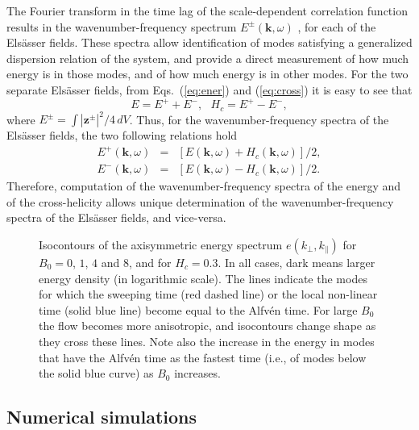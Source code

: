 \documentclass[aip,pop,reprint,amsmath,amssymb,floatfix]{revtex4-1}
\renewcommand{\vec}[1]{\mathbf{#1}}
\begin{document}
The Fourier transform in the time lag of the scale-dependent correlation function results in the wavenumber-frequency spectrum $E^\pm(\vec{k},\omega)$ \cite{clark_di_leoni_quantification_2014, clark_di_leoni_spatio-temporal_2015}, for each of the Els\"asser fields. These spectra allow identification of modes satisfying a generalized dispersion relation of the system, and provide a direct measurement of how much energy is in those modes, and of how much energy is in other modes. For the two separate Els\"asser fields, from Eqs.~(\ref{eq:ener}) and (\ref{eq:cross}) it is easy to see that
\begin{equation}
E = E^+ + E^- , \,\,\,\, H_c = E^+ - E^- ,
\end{equation}
where $E^\pm = \int |\vec{z}^\pm|^2/4 \, dV$. Thus, for the wavenumber-frequency spectra of the Els\"asser fields, the two following relations hold
\begin{eqnarray}
E^+(\vec{k},\omega) &=& [E(\vec{k},\omega) + H_c(\vec{k},\omega)]/2, \\
E^-(\vec{k},\omega) &=& [E(\vec{k},\omega) - H_c(\vec{k},\omega)]/2.
\end{eqnarray}
Therefore, computation of the wavenumber-frequency spectra of the energy and of the cross-helicity allows unique determination of the wavenumber-frequency spectra of the Els\"asser fields, and vice-versa.

\begin{figure*}
  \centering
    \caption{Isocontours of the axisymmetric energy spectrum $e(k_\perp,k_\parallel)$ for $B_0=0$, $1$, $4$ and $8$, and for $H_c = 0.3$. In all cases, dark means larger energy density (in logarithmic scale). The lines indicate the modes for which the sweeping time (red dashed line) or the local non-linear time (solid blue line) become equal to the Alfv\'en time. For large $B_0$ the flow becomes more anisotropic, and isocontours change shape as they cross these lines. Note also the increase in the energy in modes that have the Alfv\'en time as the fastest time (i.e., of modes below the solid blue curve) as $B_0$ increases.}
  \label{fig2:isocontourns}
\end{figure*}

\subsection{Numerical simulations}\label{sec_NumSim}
\end{document}
